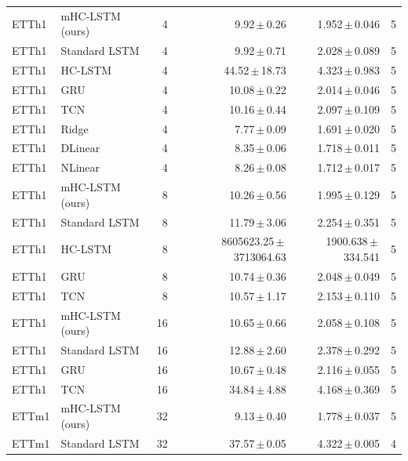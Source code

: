 \begin{table}[t]
\begin{tabular}{llrrrc}
\midrule
ETTh1 & mHC-LSTM (ours) & 4 & 9.92\,$\pm$\,0.26 & 1.952\,$\pm$\,0.046 & 5 \\
ETTh1 & Standard LSTM & 4 & 9.92\,$\pm$\,0.71 & 2.028\,$\pm$\,0.089 & 5 \\
ETTh1 & HC-LSTM & 4 & 44.52\,$\pm$\,18.73 & 4.323\,$\pm$\,0.983 & 5 \\
ETTh1 & GRU & 4 & 10.08\,$\pm$\,0.22 & 2.014\,$\pm$\,0.046 & 5 \\
ETTh1 & TCN & 4 & 10.16\,$\pm$\,0.44 & 2.097\,$\pm$\,0.109 & 5 \\
ETTh1 & Ridge & 4 & 7.77\,$\pm$\,0.09 & 1.691\,$\pm$\,0.020 & 5 \\
ETTh1 & DLinear & 4 & 8.35\,$\pm$\,0.06 & 1.718\,$\pm$\,0.011 & 5 \\
ETTh1 & NLinear & 4 & 8.26\,$\pm$\,0.08 & 1.712\,$\pm$\,0.017 & 5 \\
ETTh1 & mHC-LSTM (ours) & 8 & 10.26\,$\pm$\,0.56 & 1.995\,$\pm$\,0.129 & 5 \\
ETTh1 & Standard LSTM & 8 & 11.79\,$\pm$\,3.06 & 2.254\,$\pm$\,0.351 & 5 \\
ETTh1 & HC-LSTM & 8 & 8605623.25\,$\pm$\,3713064.63 & 1900.638\,$\pm$\,334.541 & 5 \\
ETTh1 & GRU & 8 & 10.74\,$\pm$\,0.36 & 2.048\,$\pm$\,0.049 & 5 \\
ETTh1 & TCN & 8 & 10.57\,$\pm$\,1.17 & 2.153\,$\pm$\,0.110 & 5 \\
ETTh1 & mHC-LSTM (ours) & 16 & 10.65\,$\pm$\,0.66 & 2.058\,$\pm$\,0.108 & 5 \\
ETTh1 & Standard LSTM & 16 & 12.88\,$\pm$\,2.60 & 2.378\,$\pm$\,0.292 & 5 \\
ETTh1 & GRU & 16 & 10.67\,$\pm$\,0.48 & 2.116\,$\pm$\,0.055 & 5 \\
ETTh1 & TCN & 16 & 34.84\,$\pm$\,4.88 & 4.168\,$\pm$\,0.369 & 5 \\
\midrule
ETTm1 & mHC-LSTM (ours) & 32 & 9.13\,$\pm$\,0.40 & 1.778\,$\pm$\,0.037 & 5 \\
ETTm1 & Standard LSTM & 32 & 37.57\,$\pm$\,0.05 & 4.322\,$\pm$\,0.005 & 4 \\
\bottomrule
\end{tabular}
\end{table}
